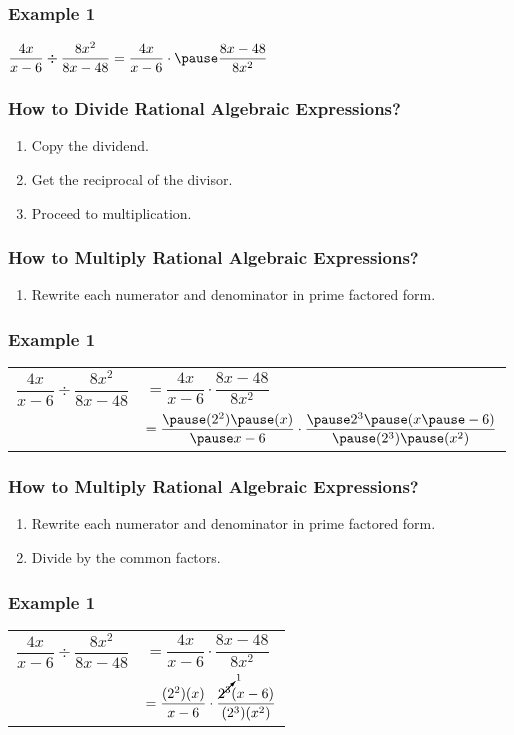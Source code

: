 \documentclass[14pt]{beamer}
\begin{document}
    \begin{frame}
    	\frametitle{Example 1}
    	$\dfrac{4x}{x - 6} \div \dfrac{8x^2}{8x - 48} = \dfrac{4x}{x - 6} \cdot \pause \dfrac{8x - 48}{8x^2} $ 
    \end{frame}

    \begin{frame}
    	\frametitle{How to Divide Rational Algebraic Expressions?}
    	\begin{enumerate}
    		\item Copy the dividend.
    		\item Get the reciprocal of the divisor.
    		\item Proceed to multiplication.
    	\end{enumerate}
    \end{frame}

    \begin{frame}
    	\frametitle{How to Multiply Rational Algebraic Expressions?}
    	\begin{enumerate}
    		\item Rewrite each numerator and denominator in prime factored form.
    	\end{enumerate}
    \end{frame}

     \begin{frame}
    	\frametitle{Example 1}
    	\begin{tabular}{ll}
    		$\dfrac{4x}{x - 6} \div \dfrac{8x^2}{8x - 48} $ & $= \dfrac{4x}{x - 6} \cdot \dfrac{8x - 48}{8x^2} $ \\[1em]
    	
    	     	& $= \dfrac{\pause (2^2)\pause (x)}{\pause x - 6} \cdot \dfrac{\pause 2^3 \pause (x\pause  - 6)}{\pause (2^3) \pause (x^2)} $ \\
    	\end{tabular}
    \end{frame}

    \begin{frame}
    	\frametitle{How to Multiply Rational Algebraic Expressions?}
    	\begin{enumerate}
    		\item Rewrite each numerator and denominator in prime factored form.
    		\item Divide by the common factors.
    	\end{enumerate}
    \end{frame}

     \begin{frame}
    	\frametitle{Example 1}
    	\begin{tabular}{ll}
    		$\dfrac{4x}{x - 6} \div \dfrac{8x^2}{8x - 48} $ & $= \dfrac{4x}{x - 6} \cdot \dfrac{8x - 48}{8x^2} $ \\[1em]
    		
    		& $= \dfrac{(2^2) (x)}{ x - 6} \cdot \dfrac{ \cancelto{1}{2^3}  (x  - 6)}{ (2^3)  (x^2)} $ \\
    	\end{tabular}
    \end{frame}
\end{document}
